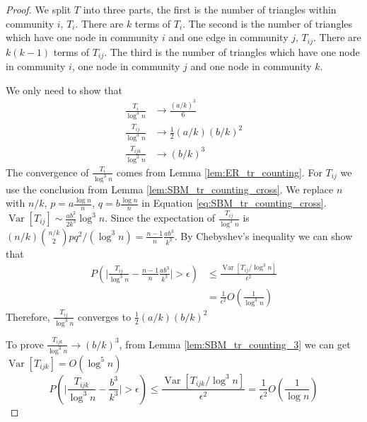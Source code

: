 \documentclass[journal]{IEEEtran}
\newcommand{\1}{\mathbbm{1}}
\DeclareMathOperator{\Var}{Var}
\begin{document}
\begin{proof}
	We split $T$ into three parts, the first is the number of triangles within community $i$, $T_i$. There are $k$ terms of $T_i$.
	The second is the number of triangles which have one node in community $i$ and one edge in community $j$, $T_{ij}$. There are $k(k-1)$ terms of $T_{ij}$. The third is the number of triangles which have one node in community $i$, one node in community $j$ and one node in community $k$.
	
	We only need to show that
	\begin{align}
	\frac{T_i}{\log ^3 n} &\to \frac{(a/k)^3}{6} \\
	\frac{T_{ij}}{\log^3 n}& \to \frac{1}{2}(a/k)(b/k)^2\\
	\frac{T_{ijk}}{\log^3 n} & \to (b/k)^3
	\end{align}
	The convergence of $\frac{T_i}{\log ^3 n}$ comes from Lemma \ref{lem:ER_tr_counting}.
	For $T_{ij}$ we use the conclusion from Lemma \ref{lem:SBM_tr_counting_cross}.
	We replace $n$ with $n/k$, $p=a\frac{\log n}{n}$, $q=b\frac{\log n}{n}$ in Equation \eqref{eq:SBM_tr_counting_cross}.
	$\Var[T_{ij}] \sim \frac{ab^2}{2k^3} \log^3 n$. Since the expectation of $\frac{T_{ij}}{\log^3 n}$ is $(n/k)\binom{n/k}{2}pq^2/(\log^3 n)
	=\frac{n-1}{n}\frac{ab^3}{k^3}$. By Chebyshev's inequality we can show that 
	\begin{align*}
	P( \Big|\frac{T_{ij}}{\log^3 n} - \frac{n-1}{n}\frac{ab^3}{k^3} \Big| > \epsilon) &\leq \frac{\Var[T_{ij} / \log^3 n]}{\epsilon^2} \\
	& = \frac{1}{\epsilon^2}
	O(\frac{1}{\log^3 n})
	\end{align*}
	Therefore, $\frac{T_{ij}}{\log^3 n} $ converges to $\frac{1}{2}(a/k)(b/k)^2$
	
	To prove $\frac{T_{ijk}}{\log^3 n}\to (b/k)^3$, from Lemma \ref{lem:SBM_tr_counting_3} we can get $\Var[T_{ijk}] = O(\log^5 n)$
	$$
	P( \Big|\frac{T_{ijk}}{\log^3 n} -\frac{b^3}{k^3} \Big| > \epsilon) \leq \frac{\Var[T_{ijk} / \log^3 n]}{\epsilon^2} = \frac{1}{\epsilon^2}
	O(\frac{1}{\log n})
	$$
\end{proof}
\end{document}
